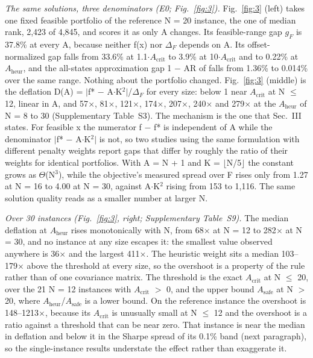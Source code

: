 \documentclass[journal]{IEEEtran}
\begin{document}
\textit{The same solutions, three denominators (E0; Fig.~\ref{fig:3}).} Fig.~\ref{fig:3} (left) takes one fixed feasible portfolio of the reference N = 20 instance, the one of median rank, 2,423 of 4,845, and scores it as only A changes. Its feasible-range gap $g_{F}$ is 37.8\% at every A, because neither f(x) nor $\Delta_{F}$ depends on A. Its offset-normalized gap falls from 33.6\% at 1.1$\cdot$$A_{\mathrm{crit}}$ to 3.9\% at 10$\cdot$$A_{\mathrm{crit}}$ and to 0.22\% at $A_{\mathrm{heur}}$, and the all-states approximation gap 1 $-$ AR of \cite{ref22} falls from 1.36\% to 0.014\% over the same range. Nothing about the portfolio changed. Fig.~\ref{fig:3} (middle) is the deflation D(A) = $|$f* $-$ A$\cdot$K$^{2}$$|$/$\Delta_{F}$ for every size: below 1 near $A_{\mathrm{crit}}$ at N $\leq$ 12, linear in A, and 57$\times$, 81$\times$, 121$\times$, 174$\times$, 207$\times$, 240$\times$ and 279$\times$ at the $A_{\mathrm{heur}}$ of N = 8 to 30 (Supplementary Table~S3). The mechanism is the one that Sec.~III states. For feasible x the numerator f $-$ f* is independent of A while the denominator $|$f* $-$ A$\cdot$K$^{2}$$|$ is not, so two studies using the same formulation with different penalty weights report gaps that differ by roughly the ratio of their weights for identical portfolios. With A = N + 1 and K = $\lfloor$N/5$\rfloor$ the constant grows as $\Theta$(N$^{3}$), while the objective's measured spread over F rises only from 1.27 at N = 16 to 4.00 at N = 30, against A$\cdot$K$^{2}$ rising from 153 to 1,116. The same solution quality reads as a smaller number at larger N.


\textit{Over 30 instances (Fig.~\ref{fig:3}, right; Supplementary Table~S9).} The median deflation at $A_{\mathrm{heur}}$ rises monotonically with N, from 68$\times$ at N = 12 to 282$\times$ at N = 30, and no instance at any size escapes it: the smallest value observed anywhere is 36$\times$ and the largest 411$\times$. The heuristic weight sits a median 103--179$\times$ above the threshold at every size, so the overshoot is a property of the rule rather than of one covariance matrix. The threshold is the exact $A_{\mathrm{crit}}$ at N $\leq$ 20, over the 21 N = 12 instances with $A_{\mathrm{crit}}$ $>$ 0, and the upper bound $A_{\mathrm{safe}}$ at N $>$ 20, where $A_{\mathrm{heur}}$/$A_{\mathrm{safe}}$ is a lower bound. On the reference instance the overshoot is 148--1213$\times$, because its $A_{\mathrm{crit}}$ is unusually small at N $\leq$ 12 and the overshoot is a ratio against a threshold that can be near zero. That instance is near the median in deflation and below it in the Sharpe spread of its 0.1\% band (next paragraph), so the single-instance results understate the effect rather than exaggerate it.
\end{document}
